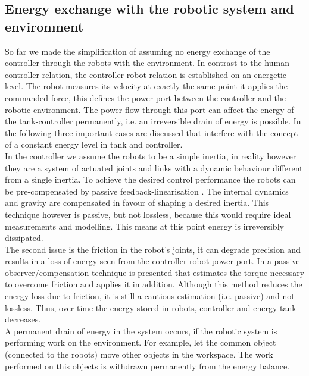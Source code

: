\documentclass[a4paper,twoside, openright,12pt]{report}
\begin{document}
\subsection{Energy exchange with the robotic system and environment}\label{SS:EnergyExchangeEnvironment}
So far we made the simplification of assuming no energy exchange of the controller through the robots with the environment. In contrast to the human-controller relation, the controller-robot relation is established on an energetic level. The robot measures its velocity at exactly the same point it applies the commanded force, this defines the power port between the controller and the robotic environment. The power flow through this port can affect the energy of the tank-controller permanently, i.e. an irreversible drain of  energy is possible. In the following three important cases are discussed that interfere with the concept of a constant energy level in tank and controller.\\ 
In the controller we assume the robots to be a simple inertia, in reality however they are a system of actuated joints and links with a dynamic behaviour different from a  single inertia. To achieve the desired control performance the robots can be pre-compensated by  passive feedback-linearisation \cite{Ott_04}. The internal dynamics and gravity are compensated in favour of shaping a desired inertia. This technique however is passive, but not lossless, because this would require ideal measurements and modelling. This means at this point energy is irreversibly dissipated. \\
The second issue is the friction in the robot's joints, it can degrade precision and results in a loss of energy seen from the controller-robot power port. In \cite{Tien_08} a passive observer/compensation technique is presented that estimates the torque necessary to overcome friction and applies it in addition. Although this method reduces the energy loss due to friction, it is still a cautious estimation (i.e. passive) and not lossless. Thus, over time the energy stored in robots, controller and energy tank decreases. \\
A permanent drain of energy in the system occurs, if the robotic system is performing work on the environment. For example, let the common object (connected to the robots) move other objects in the workspace. The work performed on this objects is withdrawn permanently from the energy balance.\\
\end{document}

